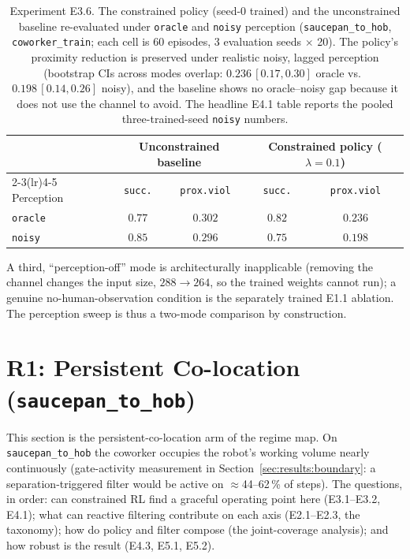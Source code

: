 \documentclass[11pt,a4paper]{report}
\begin{document}
\begin{table}[htbp]
\centering
\caption{Experiment E3.6. The constrained policy (seed-0 trained)
and the unconstrained baseline re-evaluated under \texttt{oracle} and
\texttt{noisy} perception (\texttt{saucepan\_to\_hob},
\texttt{coworker\_train}; each cell is 60 episodes, 3 evaluation
seeds $\times$ 20). The policy's proximity reduction is preserved
under realistic noisy, lagged perception (bootstrap CIs across modes
overlap: $0.236\,[0.17, 0.30]$ oracle vs.\ $0.198\,[0.14, 0.26]$
noisy), and the baseline shows no oracle--noisy gap because it does
not use the channel to avoid. The headline E4.1 table reports the
pooled three-trained-seed \texttt{noisy} numbers.}
\label{tab:e3.6-obs-rl}
\small
\begin{tabular}{lcccc}
\toprule
 & \multicolumn{2}{c}{Unconstrained baseline} & \multicolumn{2}{c}{Constrained policy ($\lambda{=}0.1$)} \\
\cmidrule(lr){2-3}\cmidrule(lr){4-5}
Perception & \texttt{succ.} & \texttt{prox.viol} & \texttt{succ.} & \texttt{prox.viol} \\
\midrule
\texttt{oracle} & $0.77$ & $0.302$ & $0.82$ & $0.236$ \\
\texttt{noisy}  & $0.85$ & $0.296$ & $0.75$ & $0.198$ \\
\bottomrule
\end{tabular}
\end{table}

A third, ``perception-off'' mode is architecturally inapplicable
(removing the channel changes the input size, $288 \to 264$, so the
trained weights cannot run); a genuine no-human-observation
condition is the separately trained E1.1 ablation. The perception
sweep is thus a two-mode comparison by construction.

\section{R1: Persistent Co-location (\texttt{saucepan\_to\_hob})}
\label{sec:results:r1}

This section is the persistent-co-location arm of the regime map. On
\texttt{saucepan\_to\_hob} the coworker occupies the robot's working
volume nearly continuously (gate-activity measurement in
Section~\ref{sec:results:boundary}: a separation-triggered filter
would be active on $\approx$44--62\,\% of steps). The questions, in
order: can constrained RL find a graceful operating point here
(E3.1--E3.2, E4.1); what can reactive filtering contribute on each
axis (E2.1--E2.3, the taxonomy); how do policy and filter compose
(the joint-coverage analysis); and how robust is the result (E4.3,
E5.1, E5.2).
\end{document}
